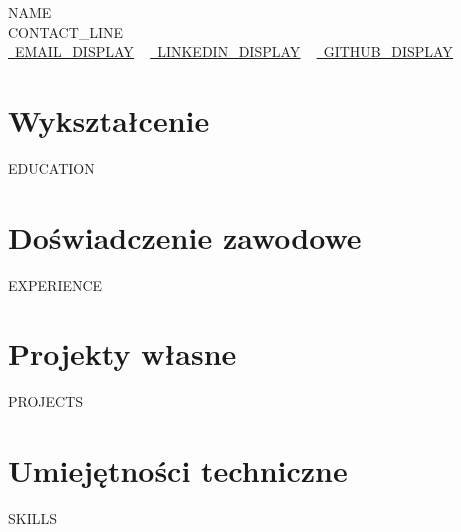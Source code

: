 \documentclass[letterpaper,11pt]{article}
\newcommand{\resumeSubHeadingListStart}{\begin{itemize}[leftmargin=0.0in, label={}]}
\newcommand{\resumeSubHeadingListEnd}{\end{itemize}}
\begin{document}
    \begin{center}
        {\Huge\scshape {{NAME}}}
        \\ {{CONTACT_LINE}}\\
        \small
        \href{mailto:{{EMAIL_URL}}}{\raisebox{-0.2\height}\faEnvelope\  \underline{{{EMAIL_DISPLAY}}}} ~
        \href{{{LINKEDIN_URL}}}{\raisebox{-0.2\height}\faLinkedin\ \underline{{{LINKEDIN_DISPLAY}}}}  ~
        \href{{{GITHUB_URL}}}{\raisebox{-0.2\height}\faGithub\ \underline{{{GITHUB_DISPLAY}}}}
    \end{center}

\section{Wykształcenie}
  \resumeSubHeadingListStart
{{EDUCATION}}
  \resumeSubHeadingListEnd

\section{Doświadczenie zawodowe}
  \resumeSubHeadingListStart
{{EXPERIENCE}}
  \resumeSubHeadingListEnd

\section{Projekty własne}
\resumeSubHeadingListStart
{{PROJECTS}}
\resumeSubHeadingListEnd

\section{Umiejętności techniczne}
\vspace{-7pt}
\begin{itemize}
[leftmargin=0.15in, label={}]\small{\item{
{{SKILLS}}
}}
\end{itemize}
\end{document}
